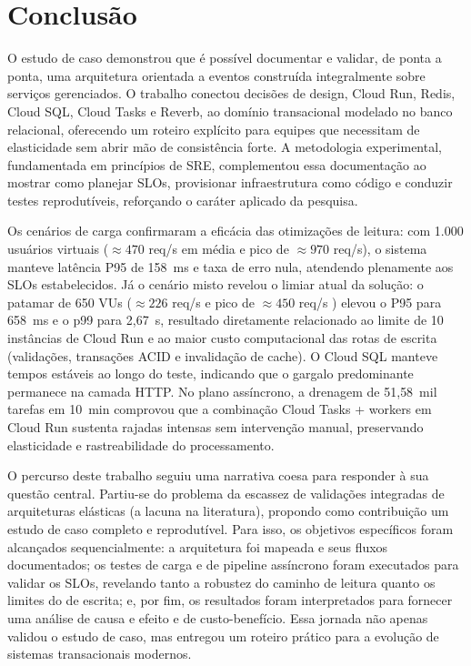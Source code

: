 \section{Conclusão}
\label{sec:conclusao}

O estudo de caso demonstrou que é possível documentar e validar, de ponta a
ponta, uma arquitetura orientada a eventos construída integralmente sobre
serviços gerenciados. O trabalho conectou decisões de design, Cloud Run, Redis,
Cloud SQL, Cloud Tasks e Reverb, ao domínio transacional modelado no banco
relacional, oferecendo um roteiro explícito para equipes que necessitam de
elasticidade sem abrir mão de consistência forte. A metodologia experimental,
fundamentada em princípios de SRE, complementou essa documentação ao mostrar
como planejar SLOs, provisionar infraestrutura como código e conduzir testes
reprodutíveis, reforçando o caráter aplicado da pesquisa.

Os cenários de carga confirmaram a eficácia das otimizações de leitura: com
1.000 usuários virtuais ($\approx 470$ req/s em média e pico de $\approx 970$
req/s), o sistema manteve latência P95 de 158~ms e taxa de erro nula, atendendo
plenamente aos SLOs estabelecidos. Já o cenário misto revelou o limiar atual da
solução: o patamar de 650 VUs ($\approx 226$ req/s e pico de $\approx 450$ req/s
) elevou o P95 para 658~ms e o p99 para 2,67~s, resultado diretamente
relacionado ao limite de 10 instâncias de Cloud Run e ao maior custo
computacional das rotas de escrita (validações, transações ACID e invalidação de
cache). O Cloud SQL manteve tempos estáveis ao longo do teste, indicando que o
gargalo predominante permanece na camada HTTP. No plano assíncrono, a drenagem
de 51{,}58~mil tarefas em 10~min comprovou que a combinação Cloud Tasks +
workers em Cloud Run sustenta rajadas intensas sem intervenção manual,
preservando elasticidade e rastreabilidade do processamento.

O percurso deste trabalho seguiu uma narrativa coesa para responder à sua
questão central. Partiu-se do problema da escassez de validações integradas de
arquiteturas elásticas (a lacuna na literatura), propondo como contribuição um
estudo de caso completo e reprodutível. Para isso, os objetivos específicos
foram alcançados sequencialmente: a arquitetura foi mapeada e seus fluxos
documentados; os testes de carga e de pipeline assíncrono foram executados para
validar os SLOs, revelando tanto a robustez do caminho de leitura quanto os
limites do de escrita; e, por fim, os resultados foram interpretados para
fornecer uma análise de causa e efeito e de custo-benefício. Essa jornada não
apenas validou o estudo de caso, mas entregou um roteiro prático para a evolução
de sistemas transacionais modernos.

